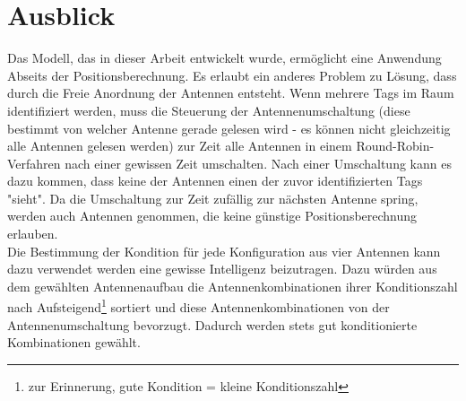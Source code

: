 \section{Ausblick}
\label{sec:Calibration_Optimaztion}
%
Das Modell, das in dieser Arbeit entwickelt wurde, ermöglicht eine Anwendung Abseits der Positionsberechnung. Es erlaubt ein anderes Problem zu Lösung, dass durch die Freie Anordnung der Antennen entsteht. Wenn mehrere Tags im Raum identifiziert werden, muss die Steuerung der Antennenumschaltung (diese bestimmt von welcher Antenne gerade gelesen wird - es können nicht gleichzeitig alle Antennen gelesen werden) zur Zeit alle Antennen in einem Round-Robin-Verfahren nach einer gewissen Zeit umschalten. Nach einer Umschaltung kann es dazu kommen, dass keine der Antennen einen der zuvor identifizierten Tags "sieht". Da die Umschaltung zur Zeit zufällig zur nächsten Antenne spring, werden auch Antennen genommen, die keine günstige Positionsberechnung erlauben.\\
Die Bestimmung der Kondition für jede Konfiguration aus vier Antennen kann dazu verwendet werden eine gewisse Intelligenz beizutragen. Dazu würden aus dem gewählten Antennenaufbau die Antennenkombinationen ihrer Konditionszahl nach Aufsteigend\footnote{zur Erinnerung, gute Kondition = kleine Konditionszahl} sortiert und diese Antennenkombinationen von der Antennenumschaltung bevorzugt. Dadurch werden stets gut konditionierte Kombinationen gewählt.



